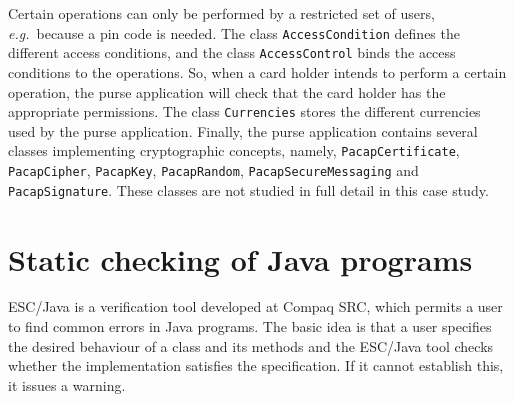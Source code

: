 \documentclass[a4paper]{llncs}
\begin{document}

Certain operations can only be performed by a restricted set of users,
\emph{e.g.}~because a pin code is needed.
The class \texttt{AccessCondition} defines the different access
conditions, and the class \texttt{AccessControl} binds the access conditions
to the operations. So, when a card holder intends to perform a certain
operation, the purse application will check that the card holder has
the appropriate permissions. %
The class \texttt{Currencies} stores the different currencies used by
the purse application.  Finally, the purse application contains several classes
implementing cryptographic concepts, namely, \texttt{PacapCertificate},
\texttt{PacapCipher}, \texttt{PacapKey}, \texttt{PacapRandom},
\texttt{PacapSecureMessaging} and \texttt{PacapSignature}. These
classes are not studied in full detail in this case study.






\section{Static checking of Java programs}
\label{SectStatic}


\label{SubSectEscJava}

ESC/Java is a verification tool developed at Compaq SRC, which permits 
a user
to find common errors in Java programs. The basic idea is that a user
specifies the desired behaviour of a class and its methods and
the ESC/Java tool checks whether the implementation satisfies the
specification. If it cannot establish this, it issues a warning.
\end{document}
